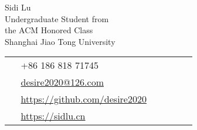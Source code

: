 \documentclass[10pt]{article} %
\begin{document}
\begin{paracol}{2} %


\parbox[top][0.12\textheight][c]{\linewidth}{ %
	\vspace{-0.04\textheight} %
	\centering %
	{\sffamily\Huge Sidi Lu}\\\medskip %
	{\color{headings} Undergraduate Student from}\\
	{\color{headings} the ACM Honored Class}\\
	{\color{headings} Shanghai Jiao Tong University}
}

\parbox[top][0.12\textheight][c]{\linewidth}{ %
	\vspace{-0.04\textheight} %
	\colorbox{shade}{ %
		\begin{supertabular}{p{0.05\linewidth}|p{0.775\linewidth}} %
			\raisebox{-1pt}{\faPhone} & +86 186 818 71745 \\ %
			\raisebox{0pt}{\small\faEnvelope} & \href{mailto:desire2020@126.com}{desire2020@126.com} \\ %
			\raisebox{-1pt}{\small\faGithub} & \href{https://github.com/desire2020}{https://github.com/desire2020} \\ %
			\raisebox{-1pt}{\faHome} & \href{https://sidilu.cn}{https://sidlu.cn} \\ %
		\end{supertabular}
	}
}


\end{paracol}
\end{document}
